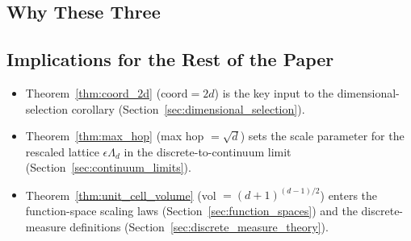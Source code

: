 \subsection{Why These Three}
\label{subsec:why_three_theorems}


\subsection{Implications for the Rest of the Paper}
\label{subsec:three_theorem_implications}

\begin{itemize}
\item Theorem~\ref{thm:coord_2d} ($\text{coord} = 2d$) is the
      key input to the dimensional-selection corollary
      (Section~\ref{sec:dimensional_selection}).
\item Theorem~\ref{thm:max_hop} (max hop $= \sqrt{d}$) sets the
      scale parameter for the rescaled lattice $\epsilon \Lambda_d$
      in the discrete-to-continuum limit
      (Section~\ref{sec:continuum_limits}).
\item Theorem~\ref{thm:unit_cell_volume} (vol $= (d+1)^{(d-1)/2}$)
      enters the function-space scaling laws
      (Section~\ref{sec:function_spaces}) and the discrete-measure
      definitions
      (Section~\ref{sec:discrete_measure_theory}).
\end{itemize}
